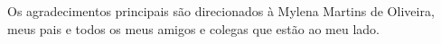 \begin{agradecimentos}
Os agradecimentos principais são direcionados à Mylena Martins de Oliveira, meus pais e todos os meus amigos e colegas que estão ao meu lado.
\end{agradecimentos}

